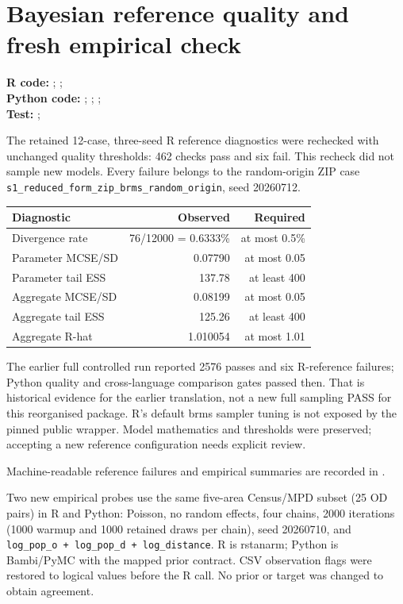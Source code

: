 \documentclass[10pt]{article}
\begin{document}
\section{Bayesian reference quality and fresh empirical check}
{\footnotesize \textbf{R code:} ; ; \\ \textbf{Python code:} ; ; ; \\ \textbf{Test:} ; \par}


The retained 12-case, three-seed R reference diagnostics were rechecked with
unchanged quality thresholds: 462 checks pass and six fail. This recheck did
not sample new models. Every failure belongs to the random-origin ZIP case
\texttt{s1\_reduced\_form\_zip\_brms\_random\_origin}, seed 20260712.

\begin{tabularx}{\textwidth}{@{}lrr@{}}
\toprule
Diagnostic & Observed & Required \\
\midrule
Divergence rate & 76/12000 = 0.6333\% & at most 0.5\% \\
Parameter MCSE/SD & 0.07790 & at most 0.05 \\
Parameter tail ESS & 137.78 & at least 400 \\
Aggregate MCSE/SD & 0.08199 & at most 0.05 \\
Aggregate tail ESS & 125.26 & at least 400 \\
Aggregate R-hat & 1.010054 & at most 1.01 \\
\bottomrule
\end{tabularx}

The earlier full controlled run reported 2576 passes and six R-reference
failures; Python quality and cross-language comparison gates passed then.
That is historical evidence for the earlier translation, not a new full
sampling PASS for this reorganised package. R's default brms sampler tuning
is not exposed by the pinned public wrapper. Model mathematics and thresholds
were preserved; accepting a new reference configuration needs explicit review.


Machine-readable reference failures and empirical summaries are recorded in
.

Two new empirical probes use the same five-area Census/MPD subset (25 OD
pairs) in R and Python: Poisson, no random effects, four chains, 2000 iterations
(1000 warmup and 1000 retained draws per chain), seed 20260710, and
\texttt{~ log\_pop\_o + log\_pop\_d + log\_distance}. R is rstanarm;
Python is Bambi/PyMC with the mapped prior contract. CSV observation flags
were restored to logical values before the R call. No prior or target was
changed to obtain agreement.
\end{document}
